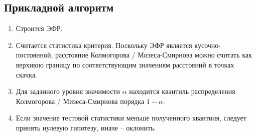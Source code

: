 \pagebreak

\subsection{Прикладной алгоритм}
\begin{enumerate}
  \item Строится ЭФР.
  \item Считается статистика критерия. Поскольку ЭФР является
  кусочно-постоянной, расстояние Колмогорова / Мизеса-Смирнова можно считать как
  верхнюю границу по соответствующим значениям расстояний в точках скачка.
  \item Для заданного уровня значимости $\alpha$ находится квантиль
  распределения Колмогорова / Мизеса-Смирнова порядка $1 - \alpha$.
  \item Если значение тестовой статистики меньше полученного квантиля,
  следует принять нулевую гипотезу, иначе -- оклонить.
\end{enumerate}
